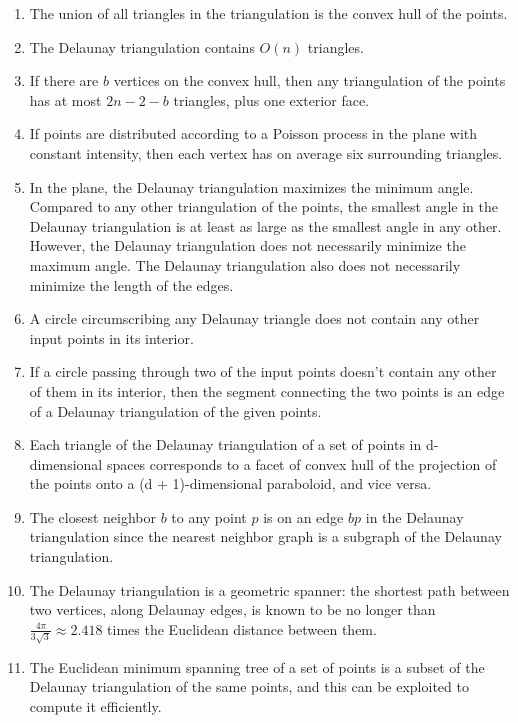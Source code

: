 \begin{enumerate}
\item The union of all triangles in the triangulation is the convex hull of the points.
\item The Delaunay triangulation contains $O(n)$ triangles.
\item If there are $b$ vertices on the convex hull, then any triangulation of the points has at most $2n-2-b$ triangles, plus one exterior face.
\item If points are distributed according to a Poisson process in the plane with constant intensity, then each vertex has on average six surrounding triangles.
\item In the plane, the Delaunay triangulation maximizes the minimum angle. Compared to any other triangulation of the points, the smallest angle in the Delaunay triangulation is at least as large as the smallest angle in any other. However, the Delaunay triangulation does not necessarily minimize the maximum angle. The Delaunay triangulation also does not necessarily minimize the length of the edges.
\item A circle circumscribing any Delaunay triangle does not contain any other input points in its interior.
\item If a circle passing through two of the input points doesn't contain any other of them in its interior, then the segment connecting the two points is an edge of a Delaunay triangulation of the given points.
\item Each triangle of the Delaunay triangulation of a set of points in d-dimensional spaces corresponds to a facet of convex hull of the projection of the points onto a (d + 1)-dimensional paraboloid, and vice versa.
\item The closest neighbor $b$ to any point $p$ is on an edge $bp$ in the Delaunay triangulation since the nearest neighbor graph is a subgraph of the Delaunay triangulation.
\item The Delaunay triangulation is a geometric spanner: the shortest path between two vertices, along Delaunay edges, is known to be no longer than ${\frac {4\pi }{3{\sqrt {3}}}}\approx 2.418$ times the Euclidean distance between them.
\item The Euclidean minimum spanning tree of a set of points is a subset of the Delaunay triangulation of the same points, and this can be exploited to compute it efficiently.
\end{enumerate}

